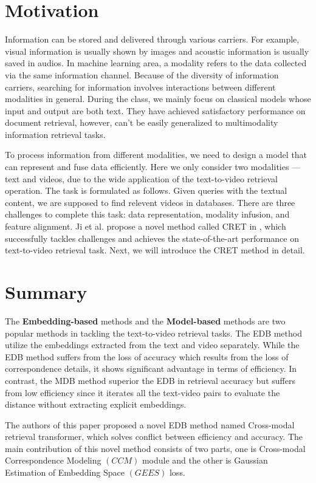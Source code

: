 \documentclass{article}
\begin{document}
\section{Motivation}
Information can be stored and delivered through various carriers. For example, visual information is usually shown by images and acoustic information is usually saved in audios. In machine learning area, a modality refers to the data collected via the same information channel. Because of the diversity of information carriers, searching for information involves interactions between different modalities in general. During the class, we mainly focus on classical models whose input and output are both text. They have achieved satisfactory performance on document retrieval, however, can't be easily generalized to multimodality information retrieval tasks.

To process information from different modalities, we need to design a model that can represent and fuse data efficiently. Here we only consider two modalities --- text and videos, due to the wide application of the text-to-video retrieval operation. The task is formulated as follows. Given queries with the textual content, we are supposed to find relevent videos in databases. There are three challenges to complete this task: data representation, modality infusion, and feature alignment. Ji et al. propose a novel method called CRET in \cite{cret}, which successfully tackles challenges and achieves the state-of-the-art performance on text-to-video retrieval task. Next, we will introduce the CRET method in detail.

\section{Summary}
The \textbf{Embedding-based} methods and the \textbf{Model-based} methods are two popular methods in tackling the text-to-video retrieval tasks. The EDB method utilize the embeddings extracted from the text and video separately. While the EDB method suffers from the loss of accuracy which results from the loss of correspondence details, it shows significant advantage in terms of efficiency. In contrast, the MDB method superior the EDB in retrieval accuracy but suffers from low efficiency since it iterates all the text-video pairs to evaluate the distance without extracting explicit embeddings.

The authors of this paper proposed a novel EDB method named Cross-modal retrieval transformer, which solves conflict between efficiency and accuracy. The main contribution of this novel method consists of two parts, one is Cross-modal Correspondence Modeling $(CCM)$  module and the other is Gaussian Estimation of Embedding Space $(GEES)$ loss. 
\end{document}
